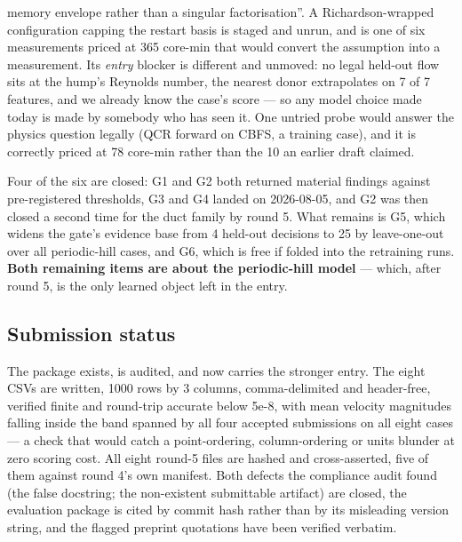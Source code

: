 \documentclass[11pt,a4paper]{article}
\begin{document}
\begin{description}
  memory envelope rather than a singular factorisation''. A Richardson-wrapped configuration
  capping the restart basis is staged and unrun, and is one of six measurements priced at 365
  core-min that would convert the assumption into a measurement. Its \emph{entry} blocker is
  different and unmoved: no legal held-out flow sits at the hump's Reynolds number, the
  nearest donor extrapolates on 7 of 7 features, and we already know the case's score --- so
  any model choice made today is made by somebody who has seen it. One untried probe would
  answer the physics question legally (QCR forward on CBFS, a training case), and it is
  correctly priced at 78 core-min rather than the 10 an earlier draft claimed.
\item[Audit items.] Four of the six are closed: G1 and G2 both returned material findings
  against pre-registered thresholds, G3 and G4 landed on 2026-08-05, and G2 was then closed
  a second time for the duct family by round 5. What remains is G5, which widens the gate's
  evidence base from 4 held-out decisions to 25 by leave-one-out over all periodic-hill
  cases, and G6, which is free if folded into the retraining runs. \textbf{Both remaining
  items are about the periodic-hill model} --- which, after round 5, is the only learned
  object left in the entry.
\end{description}

\subsection{Submission status}

The package exists, is audited, and now carries the stronger entry. The eight CSVs are
written, 1000 rows by 3 columns, comma-delimited and header-free, verified finite and
round-trip accurate below 5e-8, with mean velocity magnitudes falling inside the band
spanned by all four accepted submissions on all eight cases --- a check that would catch a
point-ordering, column-ordering or units blunder at zero scoring cost. All eight round-5
files are hashed and cross-asserted, five of them against round 4's own manifest. Both
defects the compliance audit found (the false docstring; the non-existent submittable
artifact) are closed, the evaluation package is cited by commit hash rather than by its
misleading version string, and the flagged preprint quotations have been verified verbatim.
\end{document}
